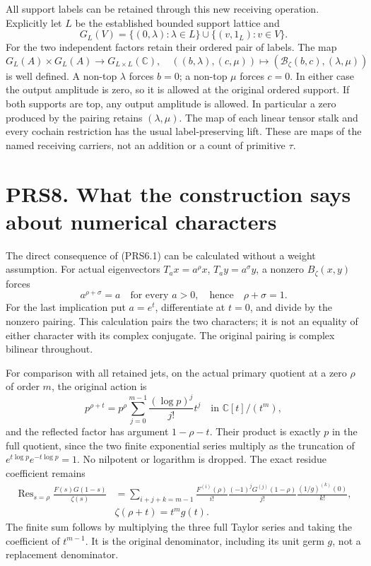 All support labels can be retained through this new receiving operation.
Explicitly let \(L\) be the established bounded support lattice and \[
G_L(V)=\{(0,\lambda):\lambda\in L\}\cup\{(v,1_L):v\in V\}.
\] For the two independent factors retain their ordered pair of labels.
The map \[
G_L(A)\times G_L(A)\longrightarrow G_{L\times L}(\mathbb C),\quad
((b,\lambda),(c,\mu))\longmapsto(\mathcal B_\zeta(b,c),(\lambda,\mu))
\tag{PRS7.2}
\] is well defined. A non-top \(\lambda\) forces \(b=0\); a non-top
\(\mu\) forces \(c=0\). In either case the output amplitude is zero, so
it is allowed at the original ordered support. If both supports are top,
any output amplitude is allowed. In particular a zero produced by the
pairing retains \((\lambda,\mu)\). The map of each linear tensor stalk
and every cochain restriction has the usual label-preserving lift. These
are maps of the named receiving carriers, not an addition or a count of
primitive \(\tau\).

\section{PRS8. What the construction says about numerical
characters}\label{prs8.-what-the-construction-says-about-numerical-characters}

The direct consequence of (PRS6.1) can be calculated without a weight
assumption. For actual eigenvectors \(T_ax=a^\rho x\),
\(T_ay=a^\sigma y\), a nonzero \(B_\zeta(x,y)\) forces \[
a^{\rho+\sigma}=a\quad\text{for every }a>0,
\quad\text{hence}\quad\rho+\sigma=1.
\tag{PRS8.1}
\] For the last implication put \(a=e^t\), differentiate at \(t=0\), and
divide by the nonzero pairing. This calculation pairs the two
characters; it is not an equality of either character with its complex
conjugate. The original pairing is complex bilinear throughout.

For comparison with all retained jets, on the actual primary quotient at
a zero \(\rho\) of order \(m\), the original action is \[
p^{\rho+t}=p^\rho\sum_{j=0}^{m-1}\frac{(\log p)^j}{j!}t^j
\quad\text{in }\mathbb C[t]/(t^m),
\tag{PRS8.2}
\] and the reflected factor has argument \(1-\rho-t\). Their product is
exactly \(p\) in the full quotient, since the two finite exponential
series multiply as the truncation of \(e^{t\log p}e^{-t\log p}=1\). No
nilpotent or logarithm is dropped. The exact residue coefficient remains
\[
\begin{aligned}
\operatorname{Res}_{s=\rho}\frac{F(s)G(1-s)}{\zeta(s)}
&=\sum_{i+j+k=m-1}\frac{F^{(i)}(\rho)}{i!}
\frac{(-1)^jG^{(j)}(1-\rho)}{j!}
\frac{(1/g)^{(k)}(0)}{k!},\\&\zeta(\rho+t)=t^m g(t).
\end{aligned}
\tag{PRS8.3}
\] The finite sum follows by multiplying the three full Taylor series
and taking the coefficient of \(t^{m-1}\). It is the original
denominator, including its unit germ \(g\), not a replacement
denominator.

